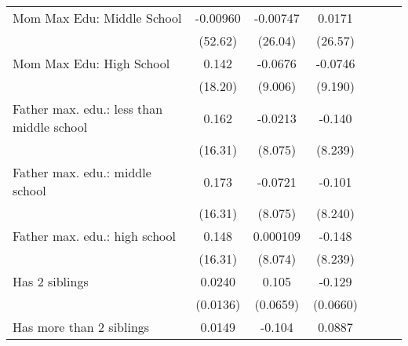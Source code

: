 {\begin{tabular}{l*{6}{c}}
\addlinespace
Mom Max Edu: Middle School&    -0.00960         &    -0.00747         &      0.0171         &                     &                     &                     \\
                    &     (52.62)         &     (26.04)         &     (26.57)         &                     &                     &                     \\
\addlinespace
Mom Max Edu: High School&       0.142         &     -0.0676         &     -0.0746         &                     &                     &                     \\
                    &     (18.20)         &     (9.006)         &     (9.190)         &                     &                     &                     \\
\addlinespace
Father max. edu.: less than middle school&       0.162         &     -0.0213         &      -0.140         &                     &                     &                     \\
                    &     (16.31)         &     (8.075)         &     (8.239)         &                     &                     &                     \\
\addlinespace
Father max. edu.: middle school&       0.173         &     -0.0721         &      -0.101         &                     &                     &                     \\
                    &     (16.31)         &     (8.075)         &     (8.240)         &                     &                     &                     \\
\addlinespace
Father max. edu.: high school&       0.148         &    0.000109         &      -0.148         &                     &                     &                     \\
                    &     (16.31)         &     (8.074)         &     (8.239)         &                     &                     &                     \\
\addlinespace
Has 2 siblings      &      0.0240         &       0.105         &      -0.129         &                     &                     &                     \\
                    &    (0.0136)         &    (0.0659)         &    (0.0660)         &                     &                     &                     \\
\addlinespace
Has more than 2 siblings&      0.0149         &      -0.104         &      0.0887         &                     &                     &                     \\

\end{tabular}}

